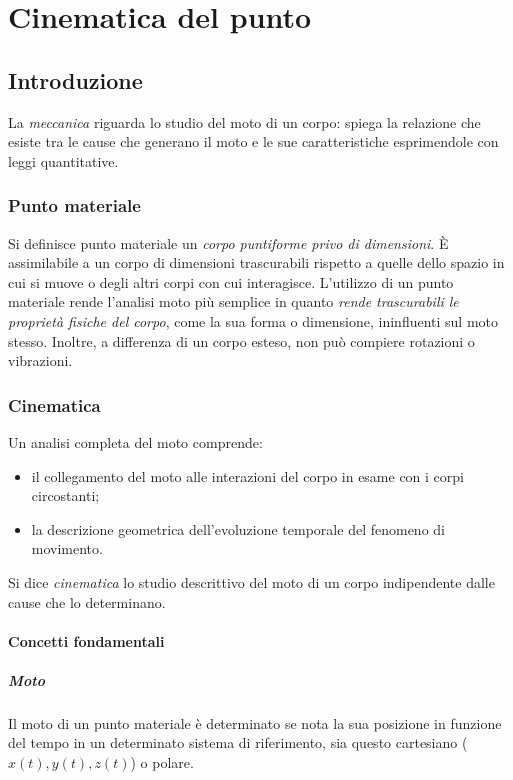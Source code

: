 \documentclass[class=book, crop=false, oneside, 12pt]{standalone}
\begin{document}
\chapter{Cinematica del punto}

\section{Introduzione}
La \emph{meccanica} riguarda lo studio del moto di un corpo: spiega la relazione che esiste tra le cause che generano il moto e le sue caratteristiche esprimendole con leggi quantitative.
  \subsection{Punto materiale}
  Si definisce punto materiale un \emph{corpo puntiforme privo di dimensioni}.
  \`E assimilabile a un corpo di dimensioni trascurabili rispetto a quelle dello spazio in cui si muove o degli altri corpi con cui interagisce.
  L'utilizzo di un punto materiale rende l'analisi moto pi\`u semplice in quanto \emph{rende trascurabili le propriet\`a fisiche del corpo}, come la sua forma o dimensione, ininfluenti sul moto stesso.
    Inoltre, a differenza di un corpo esteso, non pu\`o compiere rotazioni o vibrazioni.
  \subsection{Cinematica}
  Un analisi completa del moto comprende:
    \begin{itemize}
      \item il collegamento del moto alle interazioni del corpo in esame con i corpi circostanti;
      \item la descrizione geometrica dell'evoluzione temporale del fenomeno di movimento.
    \end{itemize}
  Si dice \emph{cinematica} lo studio descrittivo del moto di un corpo indipendente dalle cause che lo determinano.
    \subsubsection{Concetti fondamentali}
      \paragraph{Moto}
      Il moto di un punto materiale \`e determinato se nota la sua posizione in funzione del tempo in un determinato sistema di riferimento, sia questo cartesiano (\(x(t), y(t), z(t)\)) o polare.
\end{document}
